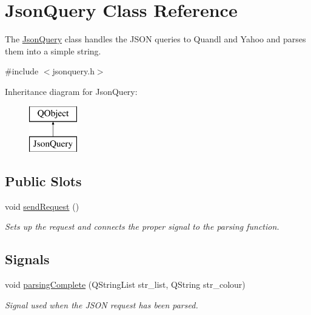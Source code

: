 \hypertarget{class_json_query}{\section{Json\+Query Class Reference}
\label{class_json_query}
}


The \hyperlink{class_json_query}{Json\+Query} class handles the J\+S\+O\+N queries to Quandl and Yahoo and parses them into a simple string.  




{\ttfamily \#include $<$jsonquery.\+h$>$}

Inheritance diagram for Json\+Query\+:\begin{figure}[H]
\begin{center}
\leavevmode
\includegraphics[height=2.000000cm]{class_json_query}
\end{center}
\end{figure}
\subsection*{Public Slots}
\begin{DoxyCompactItemize}
\item 
\hypertarget{class_json_query_a7ac6e8248b34fec56a6cfadee48ff867}{void \hyperlink{class_json_query_a7ac6e8248b34fec56a6cfadee48ff867}{send\+Request} ()}\label{class_json_query_a7ac6e8248b34fec56a6cfadee48ff867}

\begin{DoxyCompactList}\small\item\em Sets up the request and connects the proper signal to the parsing function. \end{DoxyCompactList}\end{DoxyCompactItemize}
\subsection*{Signals}
\begin{DoxyCompactItemize}
\item 
void \hyperlink{class_json_query_a384e9fd610b9046695a1f1f12e7e3ba6}{parsing\+Complete} (Q\+String\+List str\+\_\+list, Q\+String str\+\_\+colour)
\begin{DoxyCompactList}\small\item\em Signal used when the J\+S\+O\+N request has been parsed. \end{DoxyCompactList}\end{DoxyCompactItemize}
